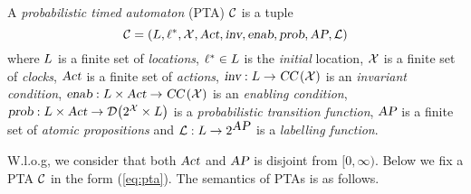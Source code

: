 \vspace{-0.6em}
\begin{definition}
A \emph{probabilistic timed automaton} (PTA) $\mathcal{C}$ is a tuple
\begin{equation}\label{eq:pta}
\mathcal{C}=\left(L, \ell^*, \mathcal{X}, \mbox{\sl Act}, \mbox{\sl inv}, \mbox{\sl enab},  \mbox{\sl prob}, \mbox{\sl AP}, \mathcal{L}\right)
\end{equation}
where 
$L$ is a finite set of \emph{locations},
$\ell^*\in L$ is the \emph{initial} location,
$\mathcal{X}$ is a finite set of \emph{clocks},
$\mbox{\sl Act}$ is a finite set of \emph{actions},
$\mbox{\sl inv}:L\rightarrow\mbox{\sl CC}\left(\mathcal{X}\right)$ is an \emph{invariant condition},
$\mbox{\sl enab}:L\times\mbox{\sl Act}\rightarrow\mbox{\sl CC}\left(\mathcal{X}\right)$ is an \emph{enabling condition},
$\mbox{\sl prob}:L\times\mbox{\sl Act}\rightarrow{\mathcal{D}}{\left(2^{\mathcal{X}}\times L\right)}$ is a \emph{probabilistic transition function},
$\mbox{\sl AP}$ is a finite set of \emph{atomic propositions} and 
$\mathcal{L}:L\rightarrow 2^{\mbox{\sl AP}}$ is a \emph{labelling function}.
\end{definition}
%
W.l.o.g, we consider that both $\mbox{\sl Act}$ and $\mbox{\sl AP}$ is disjoint from $[0,\infty)$. Below we fix a PTA $\mathcal{C}$ in the form (\ref{eq:pta}). The semantics of PTAs is as follows.

